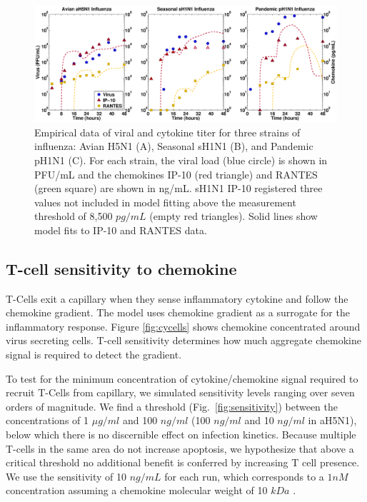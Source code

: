 \documentclass[10pt]{article}
\begin{document}
\begin{figure}[ht!]
\begin{center}
 \includegraphics[width=\textwidth]{data}
 \end{center}
\caption{Empirical data of viral and cytokine titer for three strains of influenza: Avian H5N1 (A), Seasonal sH1N1 (B), and Pandemic pH1N1 (C).  For each strain, the viral load (blue circle) is shown in PFU/mL and the chemokines IP-10 (red triangle) and RANTES (green square) are shown in ng/mL.  sH1N1 IP-10 registered three values not included in model fitting above the measurement threshold of 8,500 $pg/mL$ (empty red triangles).  Solid lines show model fits to IP-10 and RANTES data.} 
 \label{fig:data}
\end{figure}


\subsection*{T-cell sensitivity to chemokine}

T-Cells exit a capillary when they sense inflammatory cytokine and follow the chemokine gradient.  The model uses chemokine gradient as a surrogate for the inflammatory response.  Figure \ref{fig:cycells} shows chemokine concentrated around virus secreting cells.  T-cell sensitivity determines how much aggregate chemokine signal is required to detect the gradient.

To test for the minimum concentration of cytokine/chemokine signal required to recruit T-Cells from capillary, we simulated sensitivity levels ranging over seven orders of magnitude. We find a threshold (Fig.~\ref{fig:sensitivity}) between the concentrations of 1 $\mu g/ml$ and 100 $ng/ml$ (100 $ng/ml$ and 10 $ng/ml$ in aH5N1), below which there is no discernible effect on infection kinetics.  Because multiple T-cells in the same area do not increase apoptosis, we hypothesize that above a critical threshold no additional benefit is conferred by increasing T cell presence.  We use the sensitivity of 10 $ng/mL$ for each run, which corresponds to a $1 nM$ concentration assuming a chemokine molecular weight of 10 $kDa$ \cite{Gao2003}.
\end{document}
